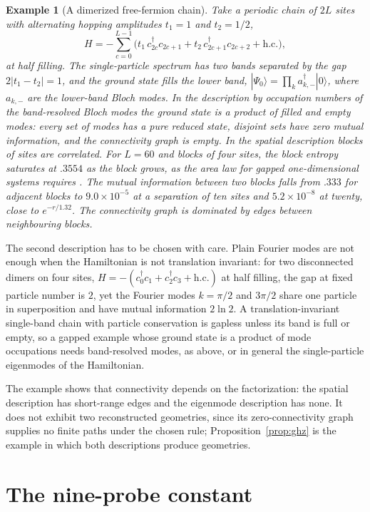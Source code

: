 \documentclass[12pt,a4paper]{article}
\newtheorem{example}[theorem]{Example}
\begin{document}
\begin{example}[A dimerized free-fermion chain]
\label{ex:fermion}
Take a periodic chain of $2L$ sites with alternating hopping amplitudes $t_1=1$ and $t_2=1/2$,
\[
H=-\sum_{c=0}^{L-1}\bigl(t_1\,c_{2c}^\dagger c_{2c+1}+t_2\,c_{2c+1}^\dagger c_{2c+2}+\mathrm{h.c.}\bigr),
\]
at half filling. The single-particle spectrum has two bands separated by the gap $2|t_1-t_2|=1$, and the ground state fills the lower band, $|\Psi_0\rangle=\prod_k a_{k,-}^\dagger|0\rangle$, where $a_{k,-}$ are the lower-band Bloch modes. In the description by occupation numbers of the band-resolved Bloch modes the ground state is a product of filled and empty modes: every set of modes has a pure reduced state, disjoint sets have zero mutual information, and the connectivity graph is empty. In the spatial description blocks of sites are correlated. For $L=60$ and blocks of four sites, the block entropy saturates at $.3554$ as the block grows, as the area law for gapped one-dimensional systems requires \cite{Hastings2007,Eisert2010}. The mutual information between two blocks falls from $.333$ for adjacent blocks to $9.0\times10^{-5}$ at a separation of ten sites and $5.2\times10^{-8}$ at twenty, close to $e^{-r/1.32}$. The connectivity graph is dominated by edges between neighbouring blocks.
\end{example}

The second description has to be chosen with care. Plain Fourier modes are not enough when the Hamiltonian is not translation invariant: for two disconnected dimers on four sites, $H=-(c_0^\dagger c_1+c_2^\dagger c_3+\mathrm{h.c.})$ at half filling, the gap at fixed particle number is $2$, yet the Fourier modes $k=\pi/2$ and $3\pi/2$ share one particle in superposition and have mutual information $2\ln2$. A translation-invariant single-band chain with particle conservation is gapless unless its band is full or empty, so a gapped example whose ground state is a product of mode occupations needs band-resolved modes, as above, or in general the single-particle eigenmodes of the Hamiltonian.

The example shows that connectivity depends on the factorization: the spatial description has short-range edges and the eigenmode description has none. It does not exhibit two reconstructed geometries, since its zero-connectivity graph supplies no finite paths under the chosen rule; Proposition~\ref{prop:ghz} is the example in which both descriptions produce geometries.


\section{The nine-probe constant}
\label{sec:probe-constant}
\end{document}
